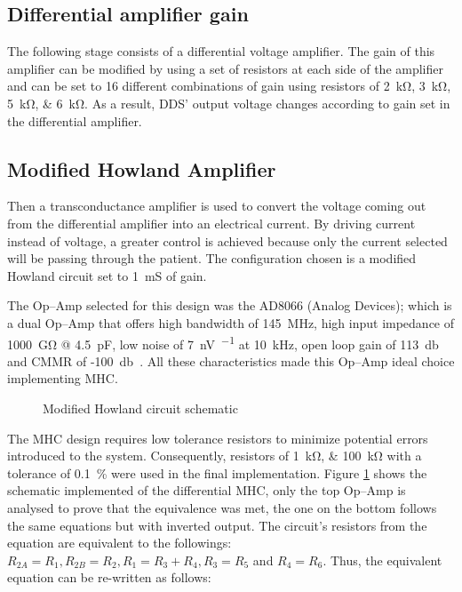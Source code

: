 \subsection{Differential amplifier gain}
The following stage consists of a differential voltage amplifier. The gain of this amplifier can be modified by using a set of resistors at each side of the amplifier and can be set to 16 different combinations of gain using resistors of \SIlist{2;3;5;6}{\kohm}. As a result, DDS’ output voltage changes according to gain set in the differential amplifier. 

\subsection{Modified Howland Amplifier}
Then a transconductance amplifier is used to convert the voltage coming out from the differential amplifier into an electrical current. By driving current instead of voltage, a greater control is achieved because only the current selected will be passing through the patient. The configuration chosen is a modified Howland circuit set to \SI{1}{\milli\siemens} of gain.
 
The Op–Amp selected for this design was the AD8066 (Analog Devices); which is a dual Op–Amp that offers high bandwidth of \SI{145}{\mega\hertz}, high input impedance of \SI{1000}{\giga\ohm} @ \SI{4.5}{\pF}, low noise of \SI{7}{\nano\volt\per{}} at \SI{10}{\kilo\hertz}, open loop gain of \SI{113}{\decibel} and CMMR of -\SI{100}{\decibel}~\cite{ad:AD8066}. All these characteristics made this Op–Amp ideal choice implementing MHC.


\begin{figure}
    \caption{Modified Howland circuit schematic}
    \label{fig:mhc}
\end{figure}

The MHC design requires low tolerance resistors to minimize potential errors introduced to the system. Consequently, resistors of \SIlist{1;100}{\kohm} with a tolerance of \SI{0.1}{\percent} were used in the final implementation. Figure \ref{fig:mhc} shows the schematic implemented of the differential MHC, only the top Op–Amp is analysed to prove that the equivalence was met, the one on the bottom follows the same equations but with inverted output. The circuit’s resistors from the equation are equivalent to the followings: $R_{2A}=R_1, R_{2B}=R_2, R_1 = R_3 + R_4, R_3 = R_5$ and $R_4 = R_6$. Thus, the equivalent equation can be re-written as follows: 

